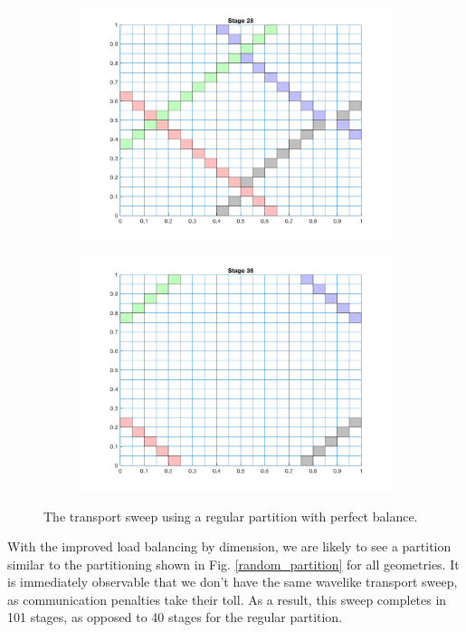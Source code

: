 \documentclass[11pt, letterpaper,titlepage,oneside]{article}
\begin{document}
\begin{figure}[H]
\begin{subfigure}{0.49\textwidth}
  \includegraphics[scale=0.5]{../figures/regular_partition_3.png}
  \end{subfigure}
  \begin{subfigure}{0.49\textwidth}
  \includegraphics[scale=0.5]{../figures/regular_partition_4.png}
  \end{subfigure}
  \caption{The transport sweep using a regular partition with perfect balance.}
  \label{regular_partition}
\end{figure}

With the improved load balancing by dimension, we are likely to see a partition similar to the partitioning shown in Fig. \ref{random_partition} for all geometries. It is immediately observable that we don't have the same wavelike transport sweep, as communication penalties take their toll. As a result, this sweep completes in 101 stages, as opposed to 40 stages for the regular partition.
\end{document}
